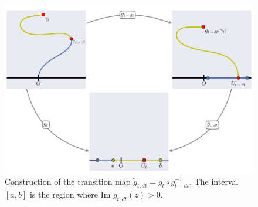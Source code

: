 \begin{figure}
\begin{center}
    \includegraphics[scale=0.4]{chapters/ch7-apdx/figs/proofscheme}
\end{center}
\caption{Construction of the transition map $\tilde{g}_{t,dt}=g_t\circ
    g_{t-dt}^{-1}$. The interval $[a,b]$ is the region where
    $\mbox{Im }\tilde{g}_{t,dt}(z)>0$.}
\label{fig:proofscheme}
\end{figure}
